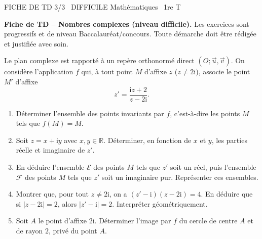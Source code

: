 \documentclass[11pt]{article}
\begin{document}
\begin{tcolorbox}[enhanced,colback=popink,colframe=popink,arc=10pt,boxrule=0pt,left=12pt,right=12pt,top=9pt,bottom=9pt]
{\color{white}\popxbold\small FICHE DE TD 3/3 \textbullet\ DIFFICILE \hfill Mathématiques \textbullet\ 1re T\par}
\end{tcolorbox}
\vspace{4pt}
\textbf{Fiche de TD -- Nombres complexes (niveau difficile).} Les exercices sont progressifs et de niveau Baccalauréat/concours. Toute démarche doit être rédigée et justifiée avec soin.

\begin{exercice}
Le plan complexe est rapporté à un repère orthonormé direct $(O;\vec{u},\vec{v})$. On considère l'application $f$ qui, à tout point $M$ d'affixe $z$ ($z\neq 2\mathrm{i}$), associe le point $M'$ d'affixe
\[ z'=\frac{\mathrm{i}z+2}{z-2\mathrm{i}}. \]
\begin{enumerate}
  \item Déterminer l'ensemble des points invariants par $f$, c'est-à-dire les points $M$ tels que $f(M)=M$.
  \item Soit $z=x+\mathrm{i}y$ avec $x,y\in\mathbb{R}$. Déterminer, en fonction de $x$ et $y$, les parties réelle et imaginaire de $z'$.
  \item En déduire l'ensemble $\mathcal{E}$ des points $M$ tels que $z'$ soit un réel, puis l'ensemble $\mathcal{F}$ des points $M$ tels que $z'$ soit un imaginaire pur. Représenter ces ensembles.
  \item Montrer que, pour tout $z\neq 2\mathrm{i}$, on a $(z'-\mathrm{i})(z-2\mathrm{i})=4$. En déduire que si $|z-2\mathrm{i}|=2$, alors $|z'-\mathrm{i}|=2$. Interpréter géométriquement.
  \item Soit $A$ le point d'affixe $2\mathrm{i}$. Déterminer l'image par $f$ du cercle de centre $A$ et de rayon $2$, privé du point $A$.
\end{enumerate}
\end{exercice}
\end{document}
